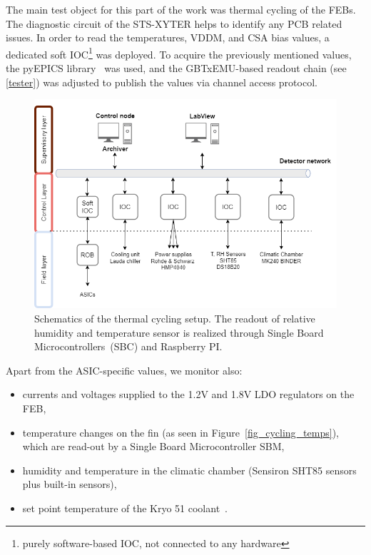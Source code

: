 The main test object for this part of the work was thermal cycling of the \gls{FEB}s. The diagnostic circuit of the STS-XYTER helps to identify any \gls{PCB} related issues. In order to read the temperatures, VDDM, and  \gls{CSA} bias values, a dedicated soft IOC\footnote{purely software-based \gls{IOC}, not connected to any hardware} was deployed. To acquire the previously mentioned values, the pyEPICS library~\cite{pyEPICS} was used, and the GBTxEMU-based readout chain (see \autoref{tester}) was adjusted to publish the values via channel access protocol. 
\begin{figure}[!h]
\centering
\includegraphics[width=0.85\columnwidth]{Chapter4/images/cycling_scheme.png}
\caption{Schematics of the thermal cycling setup. The readout of relative humidity and temperature sensor is realized through Single Board Microcontrollers~(\gls{SBC}) and Raspberry PI.}
\label{fig_setup}
\end{figure}
Apart from the \gls{ASIC}-specific values, we monitor also:
\begin{itemize}
    \item currents and voltages supplied to the 1.2V and 1.8V \gls{LDO} regulators on the \gls{FEB}, 
    \item temperature changes on the fin (as seen in Figure~\ref{fig_cycling_temps}), which are read-out by a Single Board Microcontroller \gls{SBM},
    \item humidity and temperature in the climatic chamber (Sensiron SHT85 sensors plus built-in sensors),
    \item set point temperature of the Kryo 51 coolant~\cite{KRYO}.
\end{itemize}

